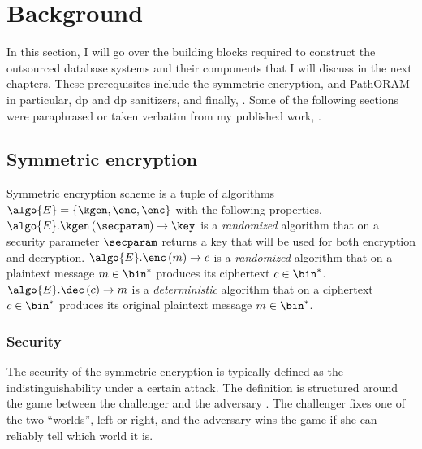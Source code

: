\chapter{Background}\label{section:background}
\thispagestyle{myheadings}

	In this section, I will go over the building blocks required to construct the outsourced database systems and their components that I will discuss in the next chapters.
	These prerequisites include the symmetric encryption,  and PathORAM \cite{path-oram} in particular, \acrlong{dp} and \acrshort{dp} sanitizers, and finally, .
	Some of the following sections were paraphrased or taken verbatim from my published work, \cite{ore-benchmark-17,epsolute}.

	\section{Symmetric encryption}\label{section:background:encryption}

		Symmetric encryption scheme is a tuple of algorithms $\algo{E} = \{ \kgen, \enc, \enc \}$ with the following properties.
		$\algo{E}.\kgen \left( \secparam \right) \to \key$ is a \emph{randomized} algorithm that on a security parameter $\secparam$ returns a key that will be used for both encryption and decryption.
		$\algo{E}.\enc \left( m \right) \to c$ is a \emph{randomized} algorithm that on a plaintext message $m \in \bin^*$ produces its ciphertext $c \in \bin^*$.
		$\algo{E}.\dec \left( c \right) \to m$ is a \emph{deterministic} algorithm that on a ciphertext $c \in \bin^*$ produces its original plaintext message $m \in \bin^*$.

		\subsection{Security}

			The security of the symmetric encryption is typically defined as the indistinguishability under a certain attack.
			The definition is structured around the game between the challenger and the adversary \adversary{}.
			The challenger fixes one of the two ``worlds'', left or right, and the adversary wins the game if she can reliably tell which world it is.

